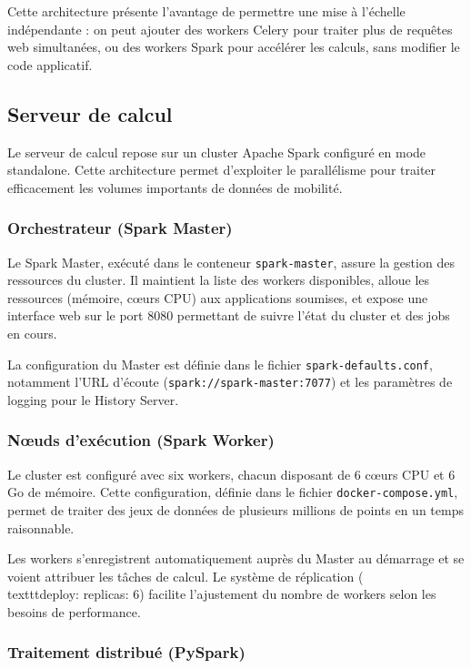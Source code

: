 \documentclass[french]{tai_info} %
\begin{document}
Cette architecture présente l'avantage de permettre une mise à l'échelle indépendante : on peut ajouter des workers Celery pour traiter plus de requêtes web simultanées, ou des workers Spark pour accélérer les calculs, sans modifier le code applicatif.

\subsection{Serveur de calcul}

Le serveur de calcul repose sur un cluster Apache Spark configuré en mode standalone. Cette architecture permet d'exploiter le parallélisme pour traiter efficacement les volumes importants de données de mobilité.

\subsubsection{Orchestrateur (Spark Master)}

Le Spark Master, exécuté dans le conteneur \texttt{spark-master}, assure la gestion des ressources du cluster. Il maintient la liste des workers disponibles, alloue les ressources (mémoire, cœurs CPU) aux applications soumises, et expose une interface web sur le port 8080 permettant de suivre l'état du cluster et des jobs en cours.

La configuration du Master est définie dans le fichier \texttt{spark-defaults.conf}, notamment l'URL d'écoute (\texttt{spark://spark-master:7077}) et les paramètres de logging pour le History Server.

\subsubsection{Nœuds d'exécution (Spark Worker)}

Le cluster est configuré avec six workers, chacun disposant de 6 cœurs CPU et 6 Go de mémoire. Cette configuration, définie dans le fichier \texttt{docker-compose.yml}, permet de traiter des jeux de données de plusieurs millions de points en un temps raisonnable.

Les workers s'enregistrent automatiquement auprès du Master au démarrage et se voient attribuer les tâches de calcul. Le système de réplication (\\texttt{deploy: replicas: 6}) facilite l'ajustement du nombre de workers selon les besoins de performance.

\subsubsection{Traitement distribué (PySpark)}
\end{document}
